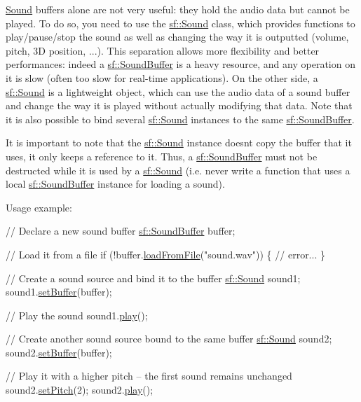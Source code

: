 \hyperlink{classsf_1_1Sound}{Sound} buffers alone are not very useful\+: they hold the audio data but cannot be played. To do so, you need to use the \hyperlink{classsf_1_1Sound}{sf\+::\+Sound} class, which provides functions to play/pause/stop the sound as well as changing the way it is outputted (volume, pitch, 3D position, ...). This separation allows more flexibility and better performances\+: indeed a \hyperlink{classsf_1_1SoundBuffer}{sf\+::\+Sound\+Buffer} is a heavy resource, and any operation on it is slow (often too slow for real-\/time applications). On the other side, a \hyperlink{classsf_1_1Sound}{sf\+::\+Sound} is a lightweight object, which can use the audio data of a sound buffer and change the way it is played without actually modifying that data. Note that it is also possible to bind several \hyperlink{classsf_1_1Sound}{sf\+::\+Sound} instances to the same \hyperlink{classsf_1_1SoundBuffer}{sf\+::\+Sound\+Buffer}.

It is important to note that the \hyperlink{classsf_1_1Sound}{sf\+::\+Sound} instance doesn\textquotesingle{}t copy the buffer that it uses, it only keeps a reference to it. Thus, a \hyperlink{classsf_1_1SoundBuffer}{sf\+::\+Sound\+Buffer} must not be destructed while it is used by a \hyperlink{classsf_1_1Sound}{sf\+::\+Sound} (i.\+e. never write a function that uses a local \hyperlink{classsf_1_1SoundBuffer}{sf\+::\+Sound\+Buffer} instance for loading a sound).

Usage example\+: 
\begin{DoxyCode}
\textcolor{comment}{// Declare a new sound buffer}
\hyperlink{classsf_1_1SoundBuffer}{sf::SoundBuffer} buffer;

\textcolor{comment}{// Load it from a file}
\textcolor{keywordflow}{if} (!buffer.\hyperlink{classsf_1_1SoundBuffer_a2be6a8025c97eb622a7dff6cf2594394}{loadFromFile}(\textcolor{stringliteral}{"sound.wav"}))
\{
    \textcolor{comment}{// error...}
\}

\textcolor{comment}{// Create a sound source and bind it to the buffer}
\hyperlink{classsf_1_1Sound}{sf::Sound} sound1;
sound1.\hyperlink{classsf_1_1Sound_a8b395e9713d0efa48a18628c8ec1972e}{setBuffer}(buffer);

\textcolor{comment}{// Play the sound}
sound1.\hyperlink{classsf_1_1Sound_a2953ffe632536e72e696fd880ced2532}{play}();

\textcolor{comment}{// Create another sound source bound to the same buffer}
\hyperlink{classsf_1_1Sound}{sf::Sound} sound2;
sound2.\hyperlink{classsf_1_1Sound_a8b395e9713d0efa48a18628c8ec1972e}{setBuffer}(buffer);

\textcolor{comment}{// Play it with a higher pitch -- the first sound remains unchanged}
sound2.\hyperlink{classsf_1_1SoundSource_a72a13695ed48b7f7b55e7cd4431f4bb6}{setPitch}(2);
sound2.\hyperlink{classsf_1_1Sound_a2953ffe632536e72e696fd880ced2532}{play}();
\end{DoxyCode}


